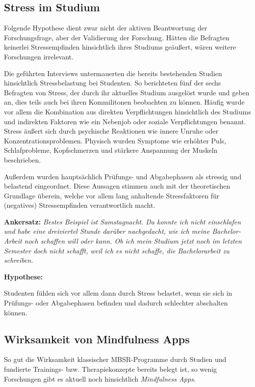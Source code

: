 \documentclass[10pt]{article}
\begin{document}
\subsection{Stress im Studium}
Folgende Hypothese dient zwar nicht der aktiven Beantwortung der Forschungsfrage, aber der Validierung der Forschung. Hätten die Befragten keinerlei Stressempfinden hinsichtlich ihres Studiums geäußert, wären weitere Forschungen irrelevant.

Die geführten Interviews untermauerten die bereits bestehenden Studien hinsichtlich Stressbelastung bei Studenten. So berichteten fünf der sechs Befragten von Stress, der durch ihr aktuelles Studium ausgelöst wurde und geben an, dies teils auch bei ihren Kommilitonen beobachten zu können.
Häufig wurde vor allem die Kombination aus direkten Verpflichtungen hinsichtlich des Studiums und indirekten Faktoren wie ein Nebenjob oder soziale Verpflichtungen benannt.
Stress äußert sich durch psychische Reaktionen wie innere Unruhe oder Konzentrationsproblemen. Physisch wurden Symptome wie erhöhter Puls, Schlafprobleme, Kopfschmerzen und stärkere Anspannung der Muskeln beschrieben.

Außerdem wurden hauptsächlich Prüfungs- und Abgabephasen als stressig und belastend eingeordnet. Diese Aussagen stimmen auch mit der theoretischen Grundlage überein, welche vor allem lang anhaltende Stressfaktoren für (negatives) Stressempfinden verantwortlich macht.

\medskip

\textbf{Ankersatz:}
\grqq \textit{Bestes Beispiel ist Samstagnacht. Da konnte ich nicht einschlafen und habe eine dreiviertel Stunde darüber nachgedacht, wie ich meine Bachelor-Arbeit noch schaffen will oder kann. Ob ich mein Studium jetzt noch im letzten Semester doch nicht schafft, weil ich es nicht schaffe, die Bachelorarbeit zu schreiben.}\grqq\

\medskip

\textbf{Hypothese: }

Studenten fühlen sich vor allem dann durch Stress belastet, wenn sie sich in Prüfungs- oder Abgabephasen befinden und dadurch schlechter abschalten können.


\subsection{Wirksamkeit von Mindfulness Apps}
So gut die Wirksamkeit klassischer MBSR-Programme durch Studien und fundierte Trainings- bzw. Therapiekonzepte bereits belegt ist, so wenig Forschungen gibt es aktuell noch hinsichtlich \textit{Mindfulness Apps}.
\end{document}
